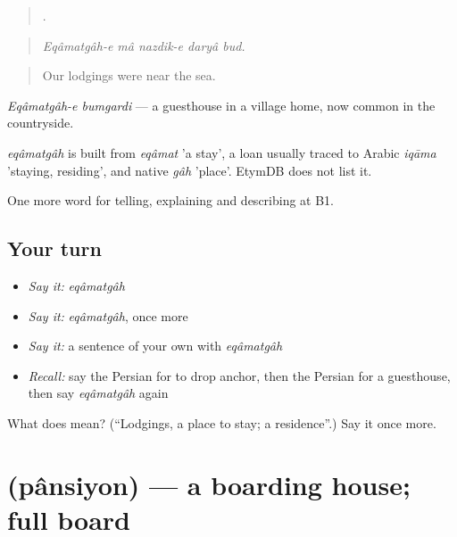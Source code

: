 \begin{quote}
    .
\end{quote}

\begin{quote}
\emph{Eqâmatgâh-e mâ nazdik-e daryâ bud.}
\end{quote}

\begin{quote}
Our lodgings were near the sea.
\end{quote}

\emph{Eqâmatgâh-e bumgardi} — a guesthouse in a village home, now common in the countryside.

\begin{cousinweb}
\emph{eqâmatgâh} is built from \emph{eqâmat} 'a stay', a loan usually traced to Arabic \emph{iqāma} 'staying, residing', and native \emph{gâh} 'place'. EtymDB does not list it.
\end{cousinweb}

\begin{grammarlens}[title={What you've built}]
One more word for telling, explaining and describing at B1.
\end{grammarlens}

\subsection*{Your turn}
\begin{itemize}
\raggedright
  \item \emph{Say it:} \emph{eqâmatgâh}
  \item \emph{Say it:} \emph{eqâmatgâh}, once more
  \item \emph{Say it:} a sentence of your own with \emph{eqâmatgâh}
  \item \emph{Recall:} say the Persian for to drop anchor, then the Persian for a guesthouse, then say \emph{eqâmatgâh} again
\end{itemize}

\begin{tcolorbox}[breakable,colback=teal!4,colframe=teal!35!black,title={Before you move on}]
What does  mean? (\textquotedblleft{}Lodgings, a place to stay; a residence\textquotedblright{}.) Say it once more.
\end{tcolorbox}
\section[\texorpdfstring{\fa{پانسیون} (pânsiyon)}{پانسیون (pânsiyon)}]{ (pânsiyon) — a boarding house; full board}

